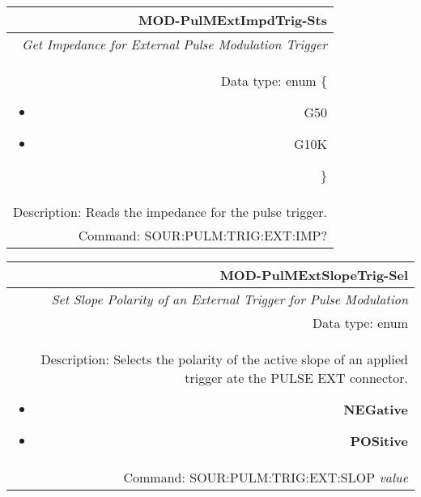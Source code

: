 \documentclass[openany]{article}
\begin{document}
		\begin{tabular}{N}
			\hline
			\bfseries MOD-PulMExtImpdTrig-Sts \\ \hline
			\emph{Get Impedance for External Pulse Modulation Trigger} \\
			Data type: enum \{\begin{itemize}[noitemsep]
				\small
				\item[] G50
				\item[] G10K
			\end{itemize}\} \\ 
			Description: Reads the impedance for the pulse trigger. \\
			Command: SOUR:PULM:TRIG:EXT:IMP? \\

		\end{tabular}
%
		\begin{tabular}{N}
			\hline
			\bfseries MOD-PulMExtSlopeTrig-Sel \\ \hline
			\emph{Set Slope Polarity of an External Trigger for Pulse Modulation} \\
			Data type: enum \\  
			Description: Selects the polarity of the active slope of an applied trigger ate the PULSE EXT connector. \begin{itemize}[noitemsep]
				\small
				\item[] \textbf{NEGative}
                                \item[] \textbf{POSitive}
			\end{itemize} \\
			Command: SOUR:PULM:TRIG:EXT:SLOP \emph{value} \\

		\end{tabular}
\end{document}
